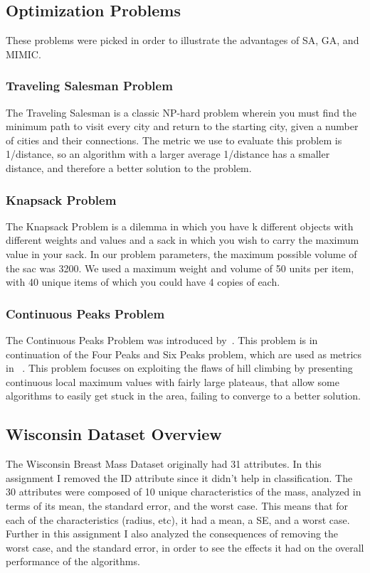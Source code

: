 \documentclass[annual]{acmsiggraph}
\begin{document}
\subsection{Optimization Problems}
These problems were picked in order to illustrate the advantages of SA, GA, and MIMIC.
\subsubsection{Traveling Salesman Problem}
The Traveling Salesman is a classic NP-hard problem wherein you must find the minimum path to visit every
city and return to the starting city, given a number of cities and their connections. The metric we use to
evaluate this problem is 1/distance, so an algorithm with a larger average 1/distance has a smaller distance,
and therefore a better solution to the problem.
\subsubsection{Knapsack Problem}
The Knapsack Problem is a dilemma in which you have k different objects with different weights and values and a 
sack in which you wish to carry the maximum value in your sack. In our problem parameters, the maximum possible 
volume of the sac was 3200. We used a maximum weight and volume of 50 units per item, with 40 unique items of 
which you could have 4 copies of each.
\subsubsection{Continuous Peaks Problem}
The Continuous Peaks Problem was introduced by~\cite{baluja1997using}. This problem is in continuation of the
Four Peaks and Six Peaks problem, which are used as metrics in ~\cite{de1997mimic}. This problem focuses on
exploiting the flaws of hill climbing by presenting continuous local maximum values with fairly large plateaus,
that allow some algorithms to easily get stuck in the area, failing to converge to a better solution. 
\subsection{Wisconsin Dataset Overview}
The Wisconsin Breast Mass Dataset originally had 31 attributes. In this assignment I removed the ID attribute
since it didn't help in classification. The 30 attributes were composed of 10 unique characteristics of the
mass, analyzed in terms of its mean, the standard error, and the worst case. This means that for each of the
characteristics (radius, etc), it had a mean, a SE, and a worst case. Further in this assignment I also analyzed
the consequences of removing the worst case, and the standard error, in order to see the effects it had on the 
overall performance of the algorithms.
\end{document}
